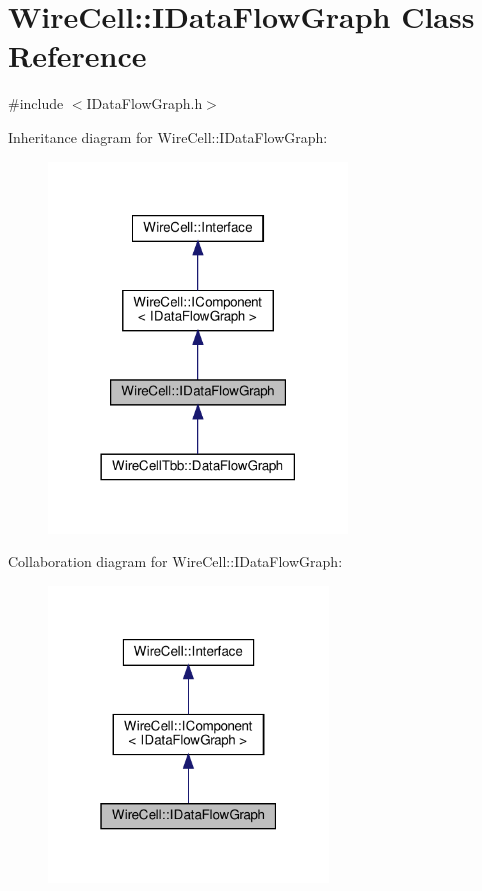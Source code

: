 \hypertarget{class_wire_cell_1_1_i_data_flow_graph}{}\section{Wire\+Cell\+:\+:I\+Data\+Flow\+Graph Class Reference}
\label{class_wire_cell_1_1_i_data_flow_graph}


{\ttfamily \#include $<$I\+Data\+Flow\+Graph.\+h$>$}



Inheritance diagram for Wire\+Cell\+:\+:I\+Data\+Flow\+Graph\+:
\nopagebreak
\begin{figure}[H]
\begin{center}
\leavevmode
\includegraphics[width=225pt]{class_wire_cell_1_1_i_data_flow_graph__inherit__graph}
\end{center}
\end{figure}


Collaboration diagram for Wire\+Cell\+:\+:I\+Data\+Flow\+Graph\+:
\nopagebreak
\begin{figure}[H]
\begin{center}
\leavevmode
\includegraphics[width=211pt]{class_wire_cell_1_1_i_data_flow_graph__coll__graph}
\end{center}
\end{figure}
